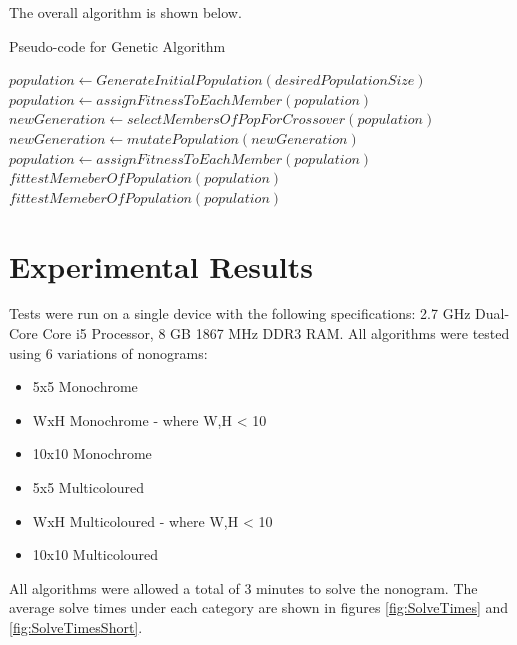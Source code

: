 \documentclass{svproc}
\begin{document}
The overall algorithm is shown below.

\begin{algorithm}
	\caption{Pseudo-code for Genetic Algorithm}
	\label{fig:garun}
	\begin{algorithmic}
		\State $population \gets GenerateInitialPopulation(desiredPopulationSize)$
		\State $population \gets assignFitnessToEachMember(population)$
		\State $newGeneration \gets selectMembersOfPopForCrossover(population)$
		\State $newGeneration \gets mutatePopulation(newGeneration)$
		\State $population \gets assignFitnessToEachMember(population)$
		\State \Return $fittestMemeberOfPopulation(population)$
		\EndIf
		\EndWhile
		\State \Return $fittestMemeberOfPopulation(population)$

	\end{algorithmic}
\end{algorithm}

\section{Experimental Results}
Tests were run on a single device with the following specifications: 2.7 GHz Dual-Core Core i5 Processor, 8 GB 1867 MHz DDR3 RAM.
	All algorithms were tested using 6 variations of nonograms:
	\begin{itemize}
	    \item 5x5 Monochrome
	    \item WxH Monochrome - where W,H < 10
	    \item 10x10 Monochrome
	    \item 5x5 Multicoloured
	    \item WxH Multicoloured - where W,H < 10
	    \item 10x10 Multicoloured
	\end{itemize}
\noindent All algorithms were allowed a total of 3 minutes to solve the nonogram.
The average solve times under each category are shown in figures \ref{fig:SolveTimes} and \ref{fig:SolveTimesShort}.
\end{document}

